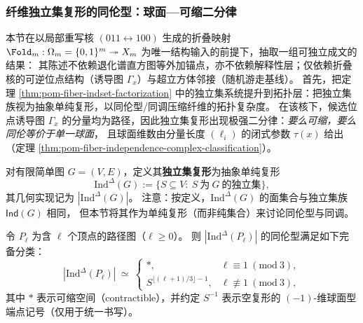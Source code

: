 %

\subsubsection{纤维独立集复形的同伦型：球面—可缩二分律}\label{subsubsec:pom-fiber-indcomplex}

本节在以局部重写核 \((011\leftrightarrow 100)\) 生成的折叠映射 \(\Fold_m:\Omega_m=\{0,1\}^m\twoheadrightarrow X_m\) 为唯一结构输入的前提下，抽取一组可独立成文的结果：
其陈述不依赖退化谱直方图等外加锚点，亦不依赖解释性层；仅依赖折叠核的可逆位点结构（诱导图 \(\Gamma_x\)）与超立方体邻接（随机游走基线）。
首先，把定理 \ref{thm:pom-fiber-indset-factorization} 中的独立集系统提升到拓扑层：把独立集族视为抽象单纯复形，以同伦型/同调压缩纤维的拓扑复杂度。
在该核下，候选位点诱导图 \(\Gamma_x\) 的分量均为路径，因此独立集复形出现极强二分律：\emph{要么可缩，要么同伦等价于单一球面}，
且球面维数由分量长度 \((\ell_i)\) 的闭式参数 \(\tau(x)\) 给出（定理 \ref{thm:pom-fiber-independence-complex-classification}）。

\begin{definition}\label{def:pom-independence-complex}
对有限简单图 \(G=(V,E)\)，定义其\textbf{独立集复形}为抽象单纯复形
\[
\mathrm{Ind}^{\Delta}(G):=\{S\subseteq V:\ S\ \text{为}\ G\ \text{的独立集}\},
\]
其几何实现记为 \(|\mathrm{Ind}^{\Delta}(G)|\)。
注意：按定义，\(\mathrm{Ind}^{\Delta}(G)\) 的面集合与独立集族 \(\mathsf{Ind}(G)\) 相同，
但本节将其作为单纯复形（而非纯集合）来讨论同伦型与同调。
\end{definition}

\begin{lemma}\label{lem:pom-independence-complex-path}
令 \(P_{\ell}\) 为含 \(\ell\) 个顶点的路径图（\(\ell\ge 0\)）。
则 \(|\mathrm{Ind}^{\Delta}(P_{\ell})|\) 的同伦型满足如下完备分类：
\[
|\mathrm{Ind}^{\Delta}(P_{\ell})|
\ \simeq\
\begin{cases}
\ast, & \ell\equiv 1\ (\mathrm{mod}\ 3),\\[2pt]
S^{\lfloor(\ell+1)/3\rfloor-1}, & \ell\not\equiv 1\ (\mathrm{mod}\ 3),
\end{cases}
\]
其中 \(\ast\) 表示可缩空间（contractible），并约定 \(S^{-1}\) 表示空复形的 \((-1)\)-维球面型端点记号（仅用于统一书写）。
\end{lemma}

